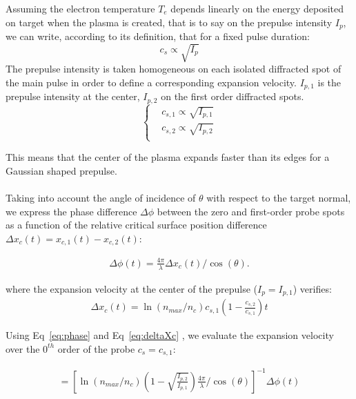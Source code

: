 \noindent Assuming the electron temperature $T_e$ depends linearly on the energy deposited on target when the plasma is created, that is to say on the prepulse intensity $I_p$, we can write, according to its definition, that for a fixed pulse duration:
$$c_s \propto \sqrt{I_p}
$$
\noindent The prepulse intensity is taken homogeneous on each isolated diffracted spot of the main pulse in order to define a corresponding expansion velocity. $I_{p,1}$ is the prepulse intensity at the center, $I_{p,2}$ on the first order diffracted spots.
\begin{equation}
\label{eq:Csirelations}
  \left\{
      \begin{aligned}
     &c_{s,1} \propto \sqrt{I_{p,1}}\\
     &c_{s,2} \propto \sqrt{I_{p,2}}\\
      \end{aligned}
    \right.
\end{equation}

\noindent This means that the center of the plasma expands faster than its edges for a Gaussian shaped prepulse. \\

\noindent {}\\
Taking into account the angle of incidence of $\theta$ with respect to the target normal, we express the phase difference $\Delta\phi$  between the zero and first-order probe spots as a function of the relative critical surface position difference $\Delta x_c(t) = x_{c,1}(t) - x_{c,2}(t)$:

\begin{align}
\Delta \phi (t) = \frac{4\pi}{\lambda}\Delta x_c(t)/\cos(\theta) 
\label{eq:phase}.
\end{align}


\noindent where the expansion velocity at the center of the prepulse ($I_p = I_{p,1}$) verifies: 
\begin{align}
\Delta x_c(t) =  \ln(n_{max}/n_c)c_{s,1}(1 - \frac{c_{s,2}}{c_{s,1}})t
\label{eq:deltaXc}
\end{align}

\noindent Using Eq~\ref{eq:phase} and Eq~\ref{eq:deltaXc} , we evaluate the expansion velocity over the $0^{th}$ order of the probe $c_s = c_{s,1}$:

\begin{align}
[c_s t] = [\ln(n_{max}/n_c)(1 - \sqrt{\frac{I_{p,2}}{I_{p,1}}})\frac{4\pi}{\lambda}/\cos(\theta)]^{-1}\Delta \phi (t)
\label{eq:Csretrieval}
\end{align}

